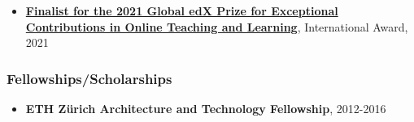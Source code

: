 \documentclass[10pt,a4paper]{article}
\begin{document}
\begin{small}
\begin{itemize}
  \item \textbf{\href{https://press.edx.org/celebrating-the-2021-edx-prize-finalists}{Finalist for the 2021 Global edX Prize for Exceptional Contributions in Online Teaching and Learning}}, International Award, 2021%

\end{itemize}








\subsubsection*{Fellowships/Scholarships}

\begin{itemize}


  \item \textbf{ETH Z\"urich Architecture and Technology Fellowship}, 2012-2016%


\end{itemize}
\end{small}
\end{document}
